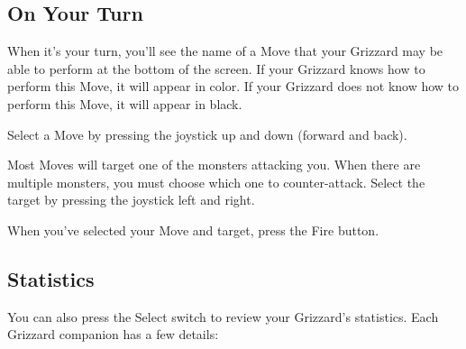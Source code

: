 \documentclass[12pt,twoside]{memoir}
\begin{document}
\subsection{On Your Turn}

When it's your turn, you'll see the name of a Move that your Grizzard may be
able to perform at the bottom of the screen. If your Grizzard knows how to
perform this Move, it will appear in color. If your Grizzard does not know
how to perform this Move, it will appear in black.

Select a Move by pressing the joystick up and down (forward and back).

Most Moves will target one of the monsters attacking you. When there are
multiple monsters, you must choose which one to counter-attack. Select the
target by pressing the joystick left and right.

When you've selected your Move and target, press the Fire button.

\subsection{Statistics}

You can also press the Select switch to review your Grizzard's statistics.
Each Grizzard companion has a few details:
\end{document}
